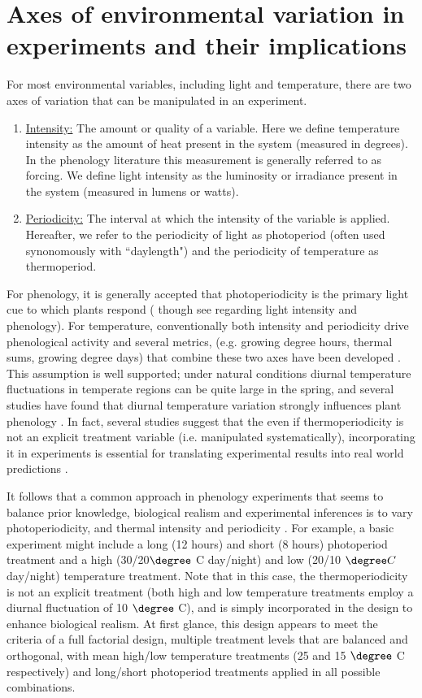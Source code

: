 \documentclass[11pt]{article}
\begin{document}
\section{Axes of environmental variation in experiments and their implications}
For most environmental variables, including light and temperature, there are two axes of variation that can be manipulated in an experiment.  
\begin{enumerate}
\item \underline{Intensity:} The amount or quality of a variable. Here we define temperature intensity as the amount of heat present in the system (measured in degrees).  In the phenology literature this measurement is generally referred to as forcing. We define light intensity as the luminosity or irradiance present in the system (measured in lumens or watts). 
\item \underline{Periodicity:} The interval at which the intensity of the variable is applied. Hereafter, we refer to the periodicity of light as photoperiod (often used synonomously with ``daylength") and the periodicity of temperature as thermoperiod. 
\end{enumerate}

For phenology, it is generally accepted that photoperiodicity is the primary light cue to which plants respond (\citep{} though see \citep{} regarding light intensity and phenology). For temperature, conventionally both intensity and periodicity drive phenological activity \citep{} and several metrics, (e.g. growing degree hours, thermal sums, growing degree days)  that combine these two axes have been developed \citep{}. This assumption is well supported; under natural conditions diurnal temperature fluctuations in temperate regions can be quite large in the spring, and several studies have found that diurnal temperature variation strongly influences plant phenology \citep{}. In fact, several studies suggest that the even if thermoperiodicity is not an explicit treatment variable (i.e. manipulated systematically), incorporating it in experiments is essential for translating experimental results into real world predictions \citep{}.

It follows that a common approach in phenology experiments that seems to balance prior knowledge, biological realism and experimental inferences is to vary photoperiodicity, and thermal intensity and periodicity \citep{}. For example, a basic experiment might include a long (12 hours) and short (8 hours) photoperiod treatment and a high (30/20$\degree$ C day/night) and low (20/10 $\degree C$ day/night) temperature treatment. Note that in this case, the thermoperiodicity is not an explicit treatment (both high and low temperature treatments employ a diurnal fluctuation of 10 $\degree$ C), and is simply incorporated in the design to enhance biological realism. At first glance, this design appears to meet the criteria of a full factorial design, multiple treatment levels that are balanced and orthogonal, with mean high/low temperature treatments (25 and 15 $\degree$ C respectively) and long/short photoperiod treatments applied in all possible combinations.
\end{document}
